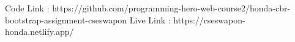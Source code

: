 Code Link : https://github.com/programming-hero-web-course2/honda-cbr-bootstrap-assignment-cseswapon
Live Link : https://cseswapon-honda.netlify.app/